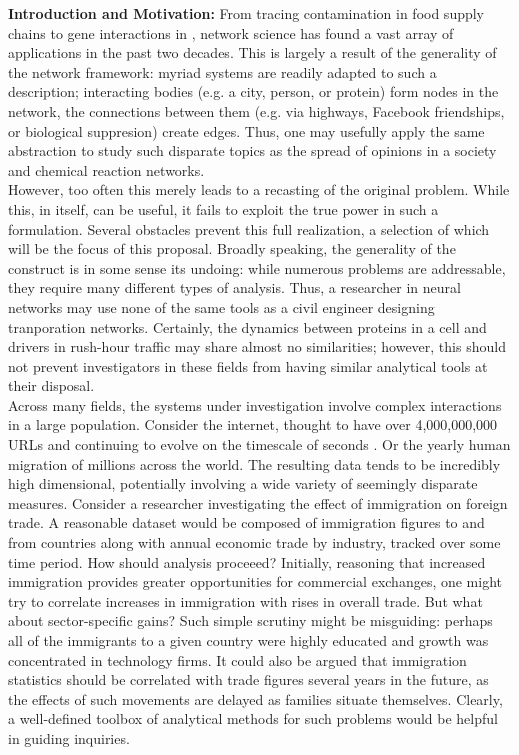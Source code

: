 \documentclass[11pt]{article}
\begin{document}
\noindent \textbf{Introduction and Motivation:} From tracing contamination in food supply chains \cite{barbasi} to gene interactions in \cite{harvardCelegans}, network science has found a vast array of applications in the past two decades. This is largely a result of the generality of the network framework: myriad systems are readily adapted to such a description; interacting bodies (e.g. a city, person, or protein) form nodes in the network, the connections between them (e.g. via highways, Facebook friendships, or biological suppresion) create edges. Thus, one may usefully apply the same abstraction to study such disparate topics as the spread of opinions in a society and chemical reaction networks. \\
However, too often this merely leads to a recasting of the original problem. While this, in itself, can be useful, it fails to exploit the true power in such a formulation. Several obstacles prevent this full realization, a selection of which will be the focus of this proposal. Broadly speaking, the generality of the construct is in some sense its undoing: while numerous problems are addressable, they require many different types of analysis. Thus, a researcher in neural networks may use none of the same tools as a civil engineer designing tranporation networks. Certainly, the dynamics between proteins in a cell and drivers in rush-hour traffic may share almost no similarities; however, this should not prevent investigators in these fields from having similar analytical tools at their disposal.\\ %
\indent Across many fields, the systems under investigation involve complex interactions in a large population. Consider the internet, thought to have over 4,000,000,000 URLs and continuing to evolve on the timescale of seconds \cite{internet paper}. Or the yearly human migration of millions across the world. The resulting data tends to be incredibly high dimensional, potentially involving a wide variety of seemingly disparate measures. Consider a researcher investigating the effect of immigration on foreign trade. A reasonable dataset would be composed of immigration figures to and from countries along with annual economic trade by industry, tracked over some time period. How should analysis proceeed? Initially, reasoning that increased immigration provides greater opportunities for commercial exchanges, one might try to correlate increases in immigration with rises in overall trade. But what about sector-specific gains? Such simple scrutiny might be misguiding: perhaps all of the immigrants to a given country were highly educated and growth was concentrated in technology firms. It could also be argued that immigration statistics should be correlated with trade figures several years in the future, as the effects of such movements are delayed as families situate themselves. Clearly, a well-defined toolbox of analytical methods for such problems would be helpful in guiding inquiries. \\
\end{document}
